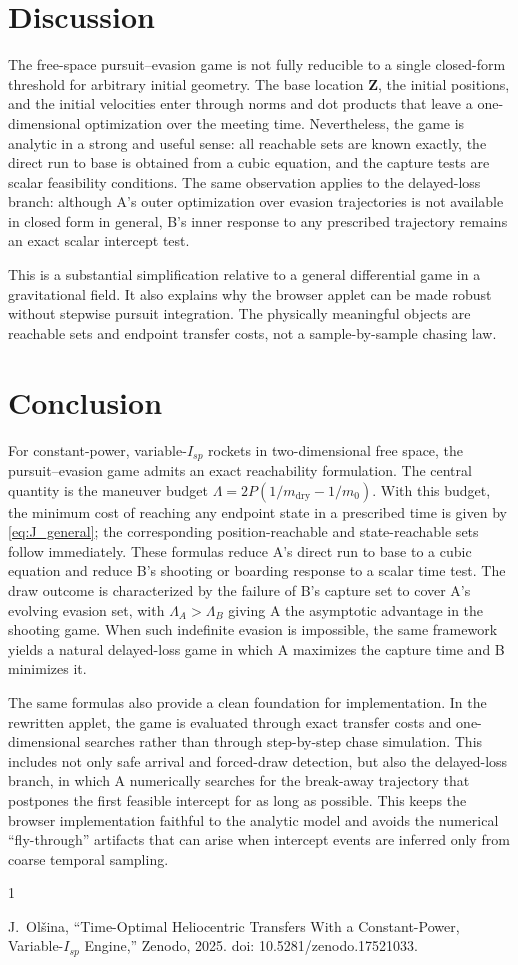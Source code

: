\documentclass[journal, a4paper]{IEEEtran}
\begin{document}
\section{Discussion}
The free-space pursuit--evasion game is not fully reducible to a single closed-form threshold for arbitrary initial geometry. The base location $\mathbf Z$, the initial positions, and the initial velocities enter through norms and dot products that leave a one-dimensional optimization over the meeting time. Nevertheless, the game is analytic in a strong and useful sense: all reachable sets are known exactly, the direct run to base is obtained from a cubic equation, and the capture tests are scalar feasibility conditions. The same observation applies to the delayed-loss branch: although A's outer optimization over evasion trajectories is not available in closed form in general, B's inner response to any prescribed trajectory remains an exact scalar intercept test.

This is a substantial simplification relative to a general differential game in a gravitational field. It also explains why the browser applet can be made robust without stepwise pursuit integration. The physically meaningful objects are reachable sets and endpoint transfer costs, not a sample-by-sample chasing law.



\section{Conclusion}
For constant-power, variable-$I_{\!sp}$ rockets in two-dimensional free space, the pursuit--evasion game admits an exact reachability formulation. The central quantity is the maneuver budget $\Lambda = 2P(1/m_{\mathrm{dry}} - 1/m_0)$. With this budget, the minimum cost of reaching any endpoint state in a prescribed time is given by \eqref{eq:J_general}; the corresponding position-reachable and state-reachable sets follow immediately. These formulas reduce A's direct run to base to a cubic equation and reduce B's shooting or boarding response to a scalar time test. The draw outcome is characterized by the failure of B's capture set to cover A's evolving evasion set, with $\Lambda_A>\Lambda_B$ giving A the asymptotic advantage in the shooting game. When such indefinite evasion is impossible, the same framework yields a natural delayed-loss game in which A maximizes the capture time and B minimizes it.

The same formulas also provide a clean foundation for implementation. In the rewritten applet, the game is evaluated through exact transfer costs and one-dimensional searches rather than through step-by-step chase simulation. This includes not only safe arrival and forced-draw detection, but also the delayed-loss branch, in which A numerically searches for the break-away trajectory that postpones the first feasible intercept for as long as possible. This keeps the browser implementation faithful to the analytic model and avoids the numerical ``fly-through'' artifacts that can arise when intercept events are inferred only from coarse temporal sampling.


\begin{thebibliography}{1}

J.~Ol{\v{s}}ina, ``Time-Optimal Heliocentric Transfers With a Constant-Power,
Variable-$I_{\!sp}$ Engine,'' Zenodo, 2025. doi: 10.5281/zenodo.17521033.

\end{thebibliography}
\end{document}
